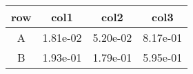 \begin{tabular}{cccc}
\toprule
row&col1&col2&col3\tabularnewline
\midrule
A&1.81e-02&5.20e-02&8.17e-01\tabularnewline
B&1.93e-01&1.79e-01&5.95e-01\tabularnewline
\bottomrule
\end{tabular}
